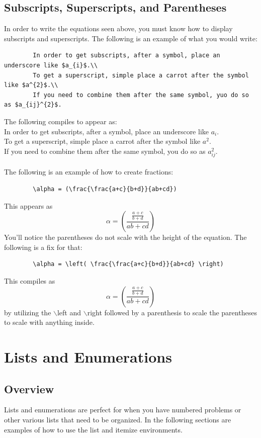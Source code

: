 \documentclass[]{article}
\newcommand{\dent}{\hspace{\parindent}} %
\begin{document}
    \subsection{Subscripts, Superscripts, and Parentheses}
    In order to write the equations seen above, you must know how to display subscripts and superscripts. The following is an example of what you would write:
    \begin{verbatim}
        In order to get subscripts, after a symbol, place an underscore like $a_{i}$.\\
        To get a superscript, simple place a carrot after the symbol like $a^{2}$.\\
        If you need to combine them after the same symbol, yuo do so as $a_{ij}^{2}$.
    \end{verbatim}
    The following compiles to appear as: \\
    In order to get subscripts, after a symbol, place an underscore like $a_{i}$.\\
    To get a superscript, simple place a carrot after the symbol like $a^{2}$.\\
    If you need to combine them after the same symbol, you do so as $a_{ij}^{2}$. \\ \\
    The following is an example of how to create fractions:
    \begin{verbatim}
        \alpha = (\frac{\frac{a+c}{b+d}}{ab+cd})
    \end{verbatim}
    This appears as \[\alpha = (\frac{\frac{a+c}{b+d}}{ab+cd})\] You'll notice the parentheses do not scale with the height of the equation. The following is a fix for that:
    \begin{verbatim}
        \alpha = \left( \frac{\frac{a+c}{b+d}}{ab+cd} \right)
    \end{verbatim}
    This compiles as \[\alpha = \left( \frac{\frac{a+c}{b+d}}{ab+cd} \right)\] by utilizing the $\backslash$left and $\backslash$right followed by a parenthesis to scale the parentheses to scale with anything inside.

    \section{Lists and Enumerations}
    \subsection{Overview}
    \dent Lists and enumerations are perfect for when you have numbered problems or other various lists that need to be organized. In the following sections are examples of how to use the list and itemize environments.
\end{document}
